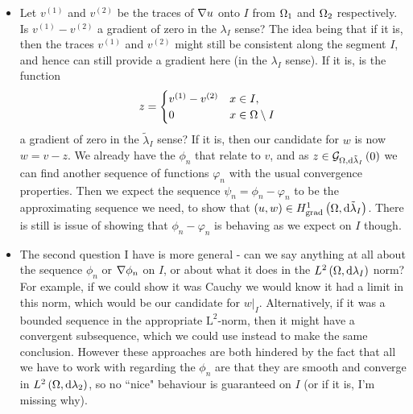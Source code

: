 \documentclass[11pt]{report}
\theoremstyle{plain}
\newcommand{\tlambda}{\tilde{\lambda}}
\begin{document}
\begin{itemize}
	\item Let $v^{(1)}$ and $v^{(2)}$ be the traces of $\nabla u$ onto $I$ from $\Omega_1$ and $\Omega_2$ respectively.
	Is $v^{(1)} - v^{(2)}$ a gradient of zero in the $\lambda_I$ sense?
	The idea being that if it is, then the traces $v^{(1)}$ and $v^{(2)}$ might still be consistent along the segment $I$, and hence can still provide a gradient here (in the $\lambda_I$ sense).
	If it is, is the function
	\begin{align*}
		z &= \begin{cases} v^{(1)} - v^{(2)} & x\in I, \\ 0 & x\in\Omega\setminus I \end{cases}
	\end{align*}
	a gradient of zero in the $\tlambda_I$ sense?
	If it is, then our candidate for $w$ is now $w = v - z$.
	We already have the $\phi_n$ that relate to $v$, and as $z\in\gradZero{\ddom}{\tlambda_I}$ we can find another sequence of functions $\varphi_n$ with the usual convergence properties.
	Then we expect the sequence $\psi_n = \phi_n - \varphi_n$ to be the approximating sequence we need, to show that $\bracs{u,w}\in\gradSob{\ddom}{\tlambda_I}$.
	There is still is issue of showing that $\phi_n-\varphi_n$ is behaving as we expect on $I$ though.
	\item The second question I have is more general - can we say anything at all about the sequence $\phi_n$ or $\nabla\phi_n$ on $I$, or about what it does in the $L^{2}\left( \Omega,\mathrm{d}\lambda_I \right)$ norm?
	For example, if we could show it was Cauchy we would know it had a limit in this norm, which would be our candidate for $w\vert_{I}$.
	Alternatively, if it was a bounded sequence in the appropriate $\mathrm{L}^2$-norm, then it might have a convergent subsequence, which we could use instead to make the same conclusion.
	However these approaches are both hindered by the fact that all we have to work with regarding the $\phi_n$ are that they are smooth and converge in $L^{2}\left( \Omega,\mathrm{d}\lambda_2 \right)$, so no ``nice" behaviour is guaranteed on $I$ (or if it is, I'm missing why).
\end{itemize}
\end{document}
